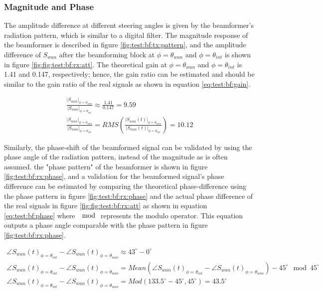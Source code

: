 \documentclass[12pt,a4paper]{report}
\begin{document}
\subsubsection{Magnitude and Phase} \label{test:bf:rx:mag}
The amplitude difference at different steering angles is given by the beamformer's radiation pattern, which is similar to a digital filter. The magnitude response of the beamformer is described in figure \ref{fig:test:bf:tx:pattern}, and the amplitude difference of $S_{wan}$ after the beamforming block at $\phi = \theta_{wan}$ and $\phi = \theta_{int}$ is shown in figure \ref{fig:fig:test:bf:rx:att}. The theoretical gain at $\phi = \theta_{wan}$ and $\phi = \theta_{int}$ is 1.41 and 0.147, respectively; hence, the gain ratio can be estimated and should be similar to the gain ratio of the real signals as shown in equation \ref{eq:test:bf:gain}.

\begin{equation}
\begin{gathered}
    \frac{|S_{wan}|_{\phi = \theta_{wan}}}{|S_{wan}|_{\phi = \theta_{int}}} \approx \frac{1.41}{0.147} = 9.59 \\
    \frac{|S_{wan}|_{\phi = \theta_{wan}}}{|S_{wan}|_{\phi = \theta_{int}}} = RMS(\frac{|S_{wan}(t)|_{\phi = \theta_{wan}}}{|S_{wan}(t)|_{\phi = \theta_{int}}}) = 10.12
    \label{eq:test:bf:gain}
\end{gathered}
\end{equation}
    
Similarly, the phase-shift of the beamformed signal can be validated by using the phase angle of the radiation pattern, instead of the magnitude as is often assumed. the "phase pattern" of the beamformer is shown in figure \ref{fig:test:bf:rx:phase}, and a validation for the beamformed signal's phase difference can be estimated by comparing the theoretical phase-difference using the phase pattern in figure \ref{fig:test:bf:rx:phase} and the actual phase difference of the real signals in figure \ref{fig:fig:test:bf:rx:att} as shown in equation \ref{eq:test:bf:phase} where $\mod$ represents the modulo operator. This equation outputs a phase angle comparable with the phase pattern in figure \ref{fig:test:bf:rx:phase}. 

\begin{equation}
\begin{gathered}
    \angle{S_{wan}(t)}_{\phi = \theta_{int}} - \angle{S_{wan}(t)}_{\phi = \theta_{wan}} \approx 43^\circ - 0^\circ \\
    \angle{S_{wan}(t)}_{\phi = \theta_{int}} - \angle{S_{wan}(t)}_{\phi = \theta_{wan}} = Mean(\angle{S_{wan}(t)}_{\phi = \theta_{int}} - \angle{S_{wan}(t)}_{\phi = \theta_{wan}}) -45^\circ \mod 45^\circ \\
    \angle{S_{wan}(t)}_{\phi = \theta_{int}} - \angle{S_{wan}(t)}_{\phi = \theta_{wan}} = Mod(133.5^\circ -45^\circ, 45^\circ) = 43.5^\circ
    \label{eq:test:bf:phase}
\end{gathered}
\end{equation}
\end{document}
